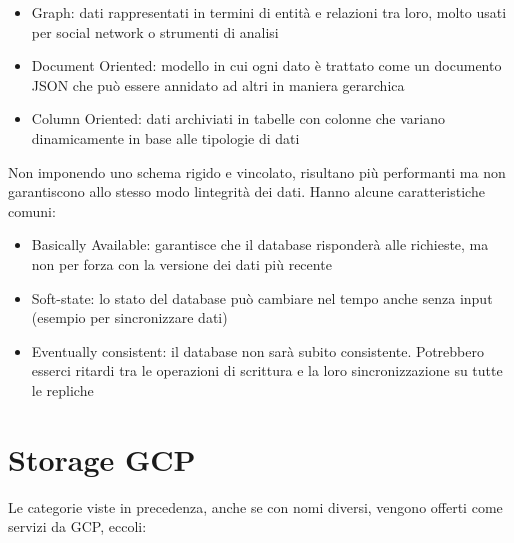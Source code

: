 \documentclass[
]{article}
\providecommand{\tightlist}{%
  \setlength{\itemsep}{0pt}\setlength{\parskip}{0pt}}
\begin{document}
{}

\begin{itemize}
\tightlist
\item
  {Graph: dati rappresentati in termini di entità e relazioni tra loro,
  molto usati per social network o strumenti di analisi}
\end{itemize}

{}

\begin{itemize}
\tightlist
\item
  {Document Oriented: modello in cui ogni dato è trattato come un
  documento JSON che può essere annidato ad altri in maniera gerarchica}
\end{itemize}

{}

\begin{itemize}
\tightlist
\item
  {Column Oriented: dati archiviati in tabelle con colonne che variano
  dinamicamente in base alle tipologie di dati}
\end{itemize}

{}

{Non imponendo uno schema rigido e vincolato, risultano più performanti
ma non garantiscono allo stesso modo l\textquotesingle integrità dei
dati. Hanno alcune caratteristiche comuni:}

\begin{itemize}
\tightlist
\item
  {Basically Available}{: garantisce che il database risponderà alle
  richieste, ma non per forza con la versione dei dati più recente }
\item
  {Soft}{-}{state}{: lo stato del database può cambiare nel tempo anche
  senza input (esempio per sincronizzare dati) }
\item
  {Eventually consistent}{: il database non sarà subito consistente.
  Potrebbero esserci ritardi tra le operazioni di scrittura e la loro
  sincronizzazione su tutte le repliche}
\end{itemize}

{}

\section{\texorpdfstring{{Storage
GCP}}{Storage GCP}}\label{h.vuxbuojz5nrk}

{Le categorie viste in precedenza, anche se con nomi diversi, vengono
offerti come servizi da GCP, eccoli:}
\end{document}
